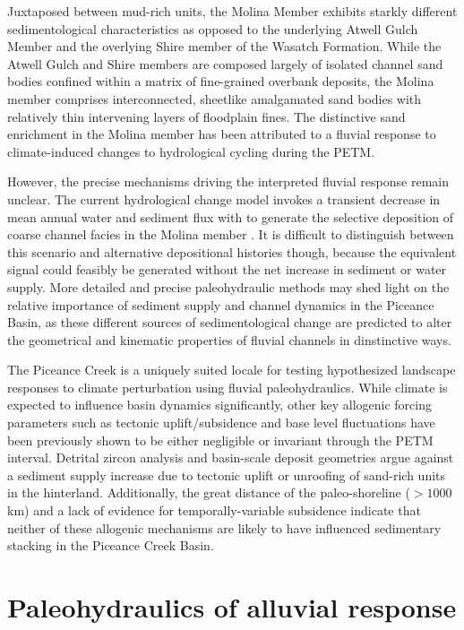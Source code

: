 \documentclass[draft]{compact_proposal}
\begin{document}
Juxtaposed between mud-rich units, the Molina Member exhibits starkly different sedimentological characteristics as opposed to the underlying Atwell Gulch Member and the overlying Shire member of the Wasatch Formation.
While the Atwell Gulch and Shire members are composed largely of isolated channel sand bodies confined within a matrix of fine-grained overbank deposits, the Molina member comprises interconnected, sheetlike amalgamated sand bodies with relatively thin intervening layers of floodplain fines.
The distinctive sand enrichment in the Molina member has been attributed to a fluvial response to climate-induced changes to hydrological cycling during the PETM.

However, the precise mechanisms driving the interpreted fluvial response remain unclear.
The current hydrological change model invokes a transient decrease in mean annual water and sediment flux with  to generate the selective deposition of coarse channel facies in the Molina member \cnote[bzf].
It is difficult to distinguish between this scenario and alternative depositional histories though, because the equivalent signal could feasibly be generated without the net increase in sediment or water supply.
More detailed and precise paleohydraulic methods may shed light on the relative importance of sediment supply and channel dynamics in the Piceance Basin, as these different sources of sedimentological change are predicted to alter the geometrical and kinematic properties of fluvial channels in dinstinctive ways.

The Piceance Creek is a uniquely suited locale for testing hypothesized landscape responses to climate perturbation using fluvial paleohydraulics.
While climate is expected to influence basin dynamics significantly, other key allogenic forcing parameters such as tectonic uplift/subsidence and base level fluctuations have been previously shown to be either negligible or invariant through the PETM interval.
Detrital zircon analysis and basin-scale deposit geometries argue against a sediment supply increase due to tectonic uplift or unroofing of sand-rich units in the hinterland.
Additionally, the great distance of the paleo-shoreline ($>1000$km) and a lack of evidence for temporally-variable subsidence indicate that neither of these allogenic mechanisms are likely to have influenced sedimentary stacking in the Piceance Creek Basin.

\section{Paleohydraulics of alluvial response}
\end{document}
